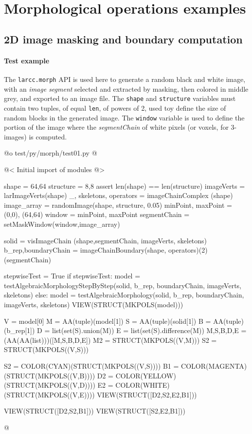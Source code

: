 \documentclass[11pt,oneside]{article}	%
\begin{document}
\section{Morphological operations examples}

\subsection{2D image masking and boundary computation}

\paragraph{Test example}

The \texttt{larcc.morph} API is used here to generate a random black and white image, with an \emph{image segment} selected and extracted by masking, then colored in middle grey, and exported to an image file.  
The \texttt{shape} and \texttt{structure} variables must contain two tuples, of equal \texttt{len}, of powers of 2, used toy define the size of random blocks in the generated image. The \texttt{window} variable is used to define the portion of the image where the \emph{segmentChain} of white pixels (or voxels, for 3-images) is computed.

@o test/py/morph/test01.py
@{
@< Initial import of modules @>

shape = 64,64
structure = 8,8
assert len(shape) == len(structure)
imageVerts = larImageVerts(shape)
_, skeletons, operators = imageChainComplex (shape)
image_array = randomImage(shape, structure, 0.05)
minPoint, maxPoint = (0,0), (64,64)
window = minPoint, maxPoint
segmentChain = setMaskWindow(window,image_array)
	
solid = visImageChain (shape,segmentChain, imageVerts, skeletons)
b_rep,boundaryChain = imageChainBoundary(shape, operators)(2)(segmentChain)

stepwiseTest = True
if stepwiseTest:
	model = testAlgebraicMorphologyStepByStep(solid, b_rep, 
				boundaryChain, imageVerts, skeletons)
else:
	model = testAlgebraicMorphology(solid, b_rep, 
				boundaryChain, imageVerts, skeletons)
VIEW(STRUCT(MKPOLS(model)))

V = model[0]
M = AA(tuple)(model[1])
S = AA(tuple)(solid[1])
B = AA(tuple)(b_rep[1])
D = list(set(S).union(M))
E = list(set(S).difference(M))
M,S,B,D,E = (AA(AA(list)))([M,S,B,D,E])
M2 = STRUCT(MKPOLS((V,M)))
S2 = STRUCT(MKPOLS((V,S)))

S2 = COLOR(CYAN)(STRUCT(MKPOLS((V,S))))
B1 = COLOR(MAGENTA)(STRUCT(MKPOLS((V,B))))
D2 = COLOR(YELLOW)(STRUCT(MKPOLS((V,D))))
E2 = COLOR(WHITE)(STRUCT(MKPOLS((V,E))))
VIEW(STRUCT([D2,S2,E2,B1]))

VIEW(STRUCT([D2,S2,B1]))
VIEW(STRUCT([S2,E2,B1]))

@}
\end{document}
